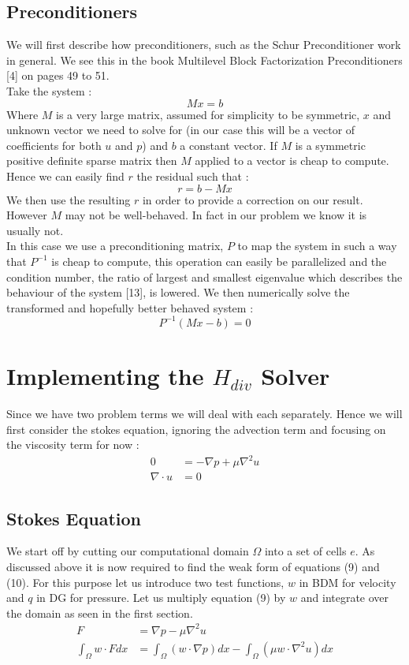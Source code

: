 \documentclass[11pt,twoside,a4paper]{article}
\begin{document}
\subsection{Preconditioners}

We will first describe how preconditioners, such as the Schur Preconditioner work in general. We see this in the book Multilevel Block Factorization Preconditioners [4] on pages 49 to 51.\\
Take the system :\\
$$
Mx = b
$$
Where $M$ is a very large matrix, assumed for simplicity to be symmetric, $x$ and unknown vector we need to solve for (in our case this will be a vector of coefficients for both $u$ and $p$) and $b$ a constant vector. If $M$ is a symmetric positive definite sparse matrix then $M$ applied to a vector is cheap to compute. Hence we can easily find $r$ the residual such that :\\
$$
r = b - Mx
$$
We then use the resulting $r$ in order to provide a correction on our result.\\
However $M$ may not be well-behaved. In fact in our problem we know it is usually not.\\
In this case we use a preconditioning matrix, $P$ to map the system in such a way that $P^{-1}$ is cheap to compute, this operation can easily be parallelized and the condition number, the ratio of largest and smallest eigenvalue which describes the behaviour of the system [13], is lowered.
We then numerically solve the transformed and hopefully better behaved system : 
$$
P^{-1}(Mx-b) = 0
$$ 


\section{Implementing the $H_{div}$ Solver}
Since we have two problem terms we will deal with each separately. Hence we will first consider the stokes equation, ignoring the advection term and focusing on the viscosity term for now :
\begin{align}
0 &= -\nabla p + \mu \nabla^2 u  \\
\nabla \cdot u &= 0
\end{align}

\subsection{Stokes Equation}
We start off by cutting our computational domain $\Omega$ into a set of cells $e$. As discussed above it is now required to find the weak form of equations (9) and (10).
For this purpose let us introduce two test functions, $w$ in BDM for velocity and $q$ in DG for pressure.
Let us multiply equation (9) by $w$ and integrate over the domain as seen in the first section.
\begin{align*}
F &= \nabla p - \mu \nabla^2 u \\
\int_\Omega w \cdot F dx &= \int_\Omega (w \cdot \nabla p) dx - \int_\Omega (\mu w \cdot \nabla^2 u) dx
\end{align*}
\end{document}
